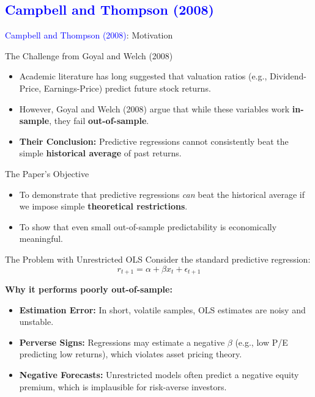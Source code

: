 \documentclass{beamer}
\begin{document}
\subsection{\textcolor{blue}{Campbell and Thompson (2008)}}
\begin{frame}{\textcolor{blue}{Campbell and Thompson (2008)}: Motivation}
    \begin{block}{The Challenge from Goyal and Welch (2008)}
        \begin{itemize}
            \item Academic literature has long suggested that valuation ratios (e.g., Dividend-Price, Earnings-Price) predict future stock returns.
            \item However, Goyal and Welch (2008) argue that while these variables work \textbf{in-sample}, they fail \textbf{out-of-sample}.
            \item \textbf{Their Conclusion:} Predictive regressions cannot consistently beat the simple \textbf{historical average} of past returns.
        \end{itemize}
    \end{block}

    \begin{block}{The Paper's Objective}
        \begin{itemize}
            \item To demonstrate that predictive regressions \textit{can} beat the historical average if we impose simple \textbf{theoretical restrictions}.
            \item To show that even small out-of-sample predictability is economically meaningful.
        \end{itemize}
    \end{block}
\end{frame}

\begin{frame}{The Problem with Unrestricted OLS}
    Consider the standard predictive regression:
    \begin{equation}
        r_{t+1} = \alpha + \beta x_t + \epsilon_{t+1}
    \end{equation}
    
    \textbf{Why it performs poorly out-of-sample:}
    \begin{itemize}
        \item \textbf{Estimation Error:} In short, volatile samples, OLS estimates are noisy and unstable.
        \item \textbf{Perverse Signs:} Regressions may estimate a negative $\beta$ (e.g., low P/E predicting low returns), which violates asset pricing theory.
        \item \textbf{Negative Forecasts:} Unrestricted models often predict a negative equity premium, which is implausible for risk-averse investors.
    \end{itemize}
\end{frame}
\end{document}
